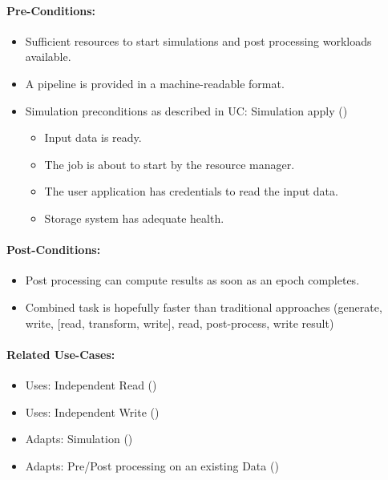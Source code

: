 \paragraph{Pre-Conditions:}
\begin{itemize}
	\item Sufficient resources to start simulations and post processing workloads available.
	\item A pipeline is provided in a machine-readable format.
	\item Simulation preconditions as described in UC: Simulation apply ()
	\begin{itemize}
		\item Input data is ready.
		\item The job is about to start by the resource manager.
		\item The user application has credentials to read the input data.
		\item Storage system has adequate health.
	\end{itemize}

\end{itemize}


\paragraph{Post-Conditions:}
\begin{itemize}
	\item Post processing can compute results as soon as an epoch completes.
	\item Combined task is hopefully faster than traditional approaches (generate, write, [read, transform, write], read, post-process, write result)
\end{itemize}


\paragraph{Related Use-Cases:}
\begin{itemize}
	\item Uses: Independent Read ()
	\item Uses: Independent Write ()
	\item Adapts: Simulation ()
	\item Adapts: Pre/Post processing on an existing Data ()
\end{itemize}


